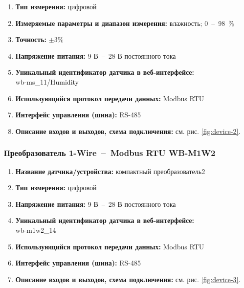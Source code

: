 \documentclass[a4paper,14pt]{extarticle}
\begin{document}
\begin{problem}
\begin{enumerate}
		\item \textbf{Тип измерения:} цифровой
		
		\item  \textbf{Измеряемые параметры и диапазон измерения:} влажность; 0~–~98~\%
		
		\item  \textbf{Точность:} $\pm3 \%$	
		\item  \textbf{Напряжение питания:} 9 В~--~28 В постоянного тока
		
		\item  \textbf{Уникальный идентификатор датчика в веб-интерфейсе:} \\wb-ms\_11/Humidity
		
		\item  \textbf{Использующийся протокол передачи данных:} Modbus RTU
		
		\item  \textbf{Интерфейс управления (шина):} RS-485
		
		\item  \textbf{Описание входов и выходов, схема подключения:} см. рис. \ref{fig:device-2}.
		
	\end{enumerate}
	
	\subsubsection*{Преобразователь 1-Wire~--~Modbus RTU WB-M1W2}
	\begin{enumerate}
		\item \textbf{Название датчика/устройства:} компактный преобразователь2
		
		\item \textbf{Тип измерения:} цифровой
		
		\item  \textbf{Напряжение питания:} 9 В~--~28 В постоянного тока
		
		\item  \textbf{Уникальный идентификатор датчика в веб-интерфейсе:}\\ wb-m1w2\_14
		
		\item  \textbf{Использующийся протокол передачи данных:} Modbus RTU
		
		\item  \textbf{Интерфейс управления (шина):} RS-485
		
		\item  \textbf{Описание входов и выходов, схема подключения:} см. рис. \ref{fig:device-3}.
		

\end{enumerate}
\end{problem}
\end{document}
